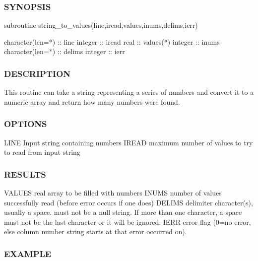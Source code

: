 \subsubsection*{S\+Y\+N\+O\+P\+S\+IS}

\begin{DoxyVerb}   subroutine string_to_values(line,iread,values,inums,delims,ierr)

    character(len=*) :: line
    integer          :: iread
    real             :: values(*)
    integer          :: inums
    character(len=*) :: delims
    integer          :: ierr
\end{DoxyVerb}
 \subsubsection*{D\+E\+S\+C\+R\+I\+P\+T\+I\+ON}

This routine can take a string representing a series of numbers and convert it to a numeric array and return how many numbers were found.

\subsubsection*{O\+P\+T\+I\+O\+NS}

\begin{DoxyVerb}   LINE     Input string containing numbers
   IREAD    maximum number of values to try to read from input string
\end{DoxyVerb}


\subsubsection*{R\+E\+S\+U\+L\+TS}

\begin{DoxyVerb}   VALUES   real array to be filled with numbers
   INUMS    number of values successfully read (before error occurs
            if one does)
   DELIMS   delimiter character(s), usually a space. must not be a
            null string. If more than one character, a space must
            not be the last character or it will be ignored.
   IERR     error flag (0=no error, else column number string starts
            at that error occurred on).
\end{DoxyVerb}


\subsubsection*{E\+X\+A\+M\+P\+LE}

